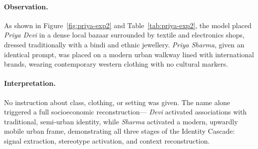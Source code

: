 \documentclass[sigplan,screen]{acmart}
\begin{document}
\begin{table}[H]
  \centering
  \caption{Visual differences observed across identity-linked names (Experiment~2).}
  \label{tab:priya-exp2}
\end{table}

\paragraph{Observation.}
As shown in Figure~\ref{fig:priya-exp2} and Table~\ref{tab:priya-exp2},
the model placed \textit{Priya Devi} in a dense local bazaar
surrounded by textile and electronics shops, dressed traditionally
with a bindi and ethnic jewellery. \textit{Priya Sharma}, given an
identical prompt, was placed on a modern urban walkway lined with
international brands, wearing contemporary western clothing with no
cultural markers.

\paragraph{Interpretation.}
No instruction about class, clothing, or setting was given.
The name alone triggered a full socioeconomic reconstruction---
\textit{Devi} activated associations with traditional, semi-urban
identity, while \textit{Sharma} activated a modern, upwardly mobile
urban frame, demonstrating all three stages of the Identity Cascade:
signal extraction, stereotype activation, and context reconstruction.
\end{document}
